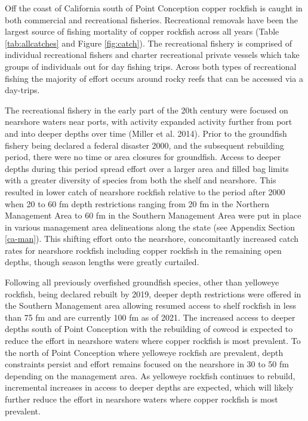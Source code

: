\documentclass[11pt,
  english,
  a4paper,
]{article}
\begin{document}
\leavevmode\tagmcend\tagstructend


Off the coast of California south of Point Conception copper rockfish is caught in both commercial and recreational fisheries. Recreational removals have been the largest source of fishing mortality of copper rockfish across all years (Table \ref{tab:allcatches} and Figure \ref{fig:catch}). The recreational fishery is comprised of individual recreational fishers and charter recreational private vessels which take groups of individuals out for day fishing trips. Across both types of recreational fishing the majority of effort occurs around rocky reefs that can be accessed via a day-trips.

\leavevmode\tagmcend\tagstructend\par


The recreational fishery in the early part of the 20th century were focused on nearshore waters near ports, with activity expanded activity further from port and into deeper depths over time {(Miller et al. 2014)\leavevmode\tagmcend\tagstructend}. Prior to the groundfish fishery being declared a federal disaster 2000, and the subsequent rebuilding period, there were no time or area closures for groundfish. Access to deeper depths during this period spread effort over a larger area and filled bag limits with a greater diversity of species from both the shelf and nearshore. This resulted in lower catch of nearshore rockfish relative to the period after 2000 when 20 to 60 fm depth restrictions ranging from 20 fm in the Northern Management Area to 60 fm in the Southern Management Area were put in place in various management area delineations along the state (see Appendix Section \ref{ca-man}). This shifting effort onto the nearshore, concomitantly increased catch rates for nearshore rockfish including copper rockfish in the remaining open depths, though season lengths were greatly curtailed.

\leavevmode\tagmcend\tagstructend\par


Following all previously overfished groundfish species, other than yelloweye rockfish, being declared rebuilt by 2019, deeper depth restrictions were offered in the Southern Management area allowing resumed access to shelf rockfish in less than 75 fm and are currently 100 fm as of 2021. The increased access to deeper depths south of Point Conception with the rebuilding of cowcod is expected to reduce the effort in nearshore waters where copper rockfish is most prevalent. To the north of Point Conception where yelloweye rockfish are prevalent, depth constraints persist and effort remains focused on the nearshore in 30 to 50 fm depending on the management area. As yelloweye rockfish continues to rebuild, incremental increases in access to deeper depths are expected, which will likely further reduce the effort in nearshore waters where copper rockfish is most prevalent.
\end{document}
